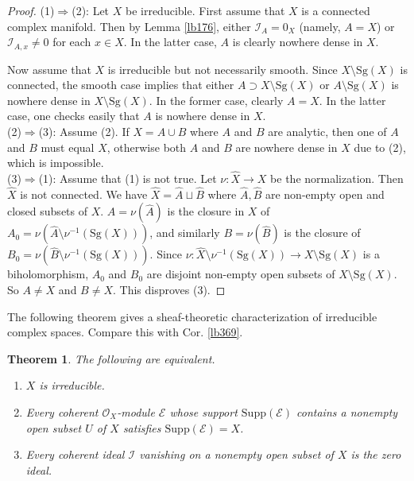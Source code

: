 \documentclass[12pt,b5paper,notitlepage]{report}
\theoremstyle{definition}
\theoremstyle{plain}
\newtheorem{thm}[df]{Theorem}
\newcommand{\mc}{\mathcal}
\newcommand{\wht}{\widehat}
\newcommand{\scr}{\mathscr}
\newcommand{\Supp}{\mathrm{Supp}}
\newcommand{\Sg}{\mathrm{Sg}}
\numberwithin{equation}{section}
\begin{document}
\begin{proof}
(1)$\Rightarrow$(2): Let $X$ be irreducible. First assume that $X$ is a connected complex manifold. Then by Lemma \ref{lb176}, either $\scr I_A=0_X$ (namely, $A=X$) or $\scr I_{A,x}\neq 0$ for each $x\in X$. In the latter case, $A$ is clearly nowhere dense in $X$.

Now assume that $X$ is irreducible but not necessarily smooth. Since $X\setminus\Sg(X)$ is connected, the smooth case implies that either $A\supset X\setminus\Sg(X)$ or $A\setminus\Sg(X)$ is nowhere dense in $X\setminus\Sg(X)$. In the former case, clearly $A=X$. In the latter case, one checks easily that $A$ is nowhere dense in $X$.\\[-1ex]

(2)$\Rightarrow$(3): Assume (2). If $X=A\cup B$ where $A$ and $B$ are analytic, then one of $A$ and $B$ must equal $X$, otherwise both $A$ and $B$ are nowhere dense in $X$ due to (2), which is impossible. \\[-1ex]


(3)$\Rightarrow$(1): Assume that (1) is not true. Let $\nu:\wht X\rightarrow X$ be the normalization. Then $\wht X$ is not connected. We have $\wht X=\wht A\sqcup \wht B$ where $\wht A,\wht B$ are non-empty open and closed subsets of $X$. $A=\nu(\wht A)$ is the closure in $X$ of $A_0=\nu(\wht A\setminus\nu^{-1}(\Sg(X)))$, and similarly $B=\nu(\wht B)$ is the closure of $B_0=\nu(\wht B\setminus\nu^{-1}(\Sg(X)))$. Since $\nu:\wht X\setminus\nu^{-1}(\Sg(X))\rightarrow X\setminus\Sg(X)$ is a biholomorphism, $A_0$ and $B_0$ are disjoint non-empty open subsets of $X\setminus\Sg(X)$. So $A\neq X$ and $B\neq X$. This disproves (3).
\end{proof}


The following theorem gives a sheaf-theoretic characterization of irreducible complex spaces. Compare this with Cor. \ref{lb369}.



\begin{thm}\label{lb240}
The following are equivalent.
\begin{enumerate}[label=(\arabic*)]
\item $X$ is irreducible.
\item Every coherent $\scr O_X$-module $\scr E$ whose support $\Supp(\scr E)$ contains a nonempty open subset $U$ of $X$ satisfies $\Supp(\scr E)=X$.
\item Every coherent ideal $\mc I$ vanishing on a nonempty open subset of $X$ is the zero ideal.
\end{enumerate}
\end{thm}
\end{document}
